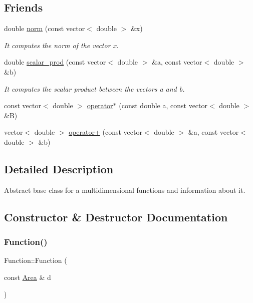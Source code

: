 \subsection*{Friends}
\begin{DoxyCompactItemize}
\item 
double \hyperlink{class_function_a52e0aa61f3f38c1b981ad4c1deeebed5}{norm} (const vector$<$ double $>$ \&x)
\begin{DoxyCompactList}\small\item\em It computes the norm of the vector x. \end{DoxyCompactList}\item 
double \hyperlink{class_function_a5bba89b945d56abb9cf2dd756cf71fb8}{scalar\+\_\+prod} (const vector$<$ double $>$ \&a, const vector$<$ double $>$ \&b)
\begin{DoxyCompactList}\small\item\em It computes the scalar product between the vectors a and b. \end{DoxyCompactList}\item 
const vector$<$ double $>$ \hyperlink{class_function_a5c042028e918038808f0b9255d846bdc}{operator$\ast$} (const double a, const vector$<$ double $>$ \&B)
\item 
vector$<$ double $>$ \hyperlink{class_function_af7fb1be44ca3ade61cec8d396d0a3ca1}{operator+} (const vector$<$ double $>$ \&a, const vector$<$ double $>$ \&b)
\end{DoxyCompactItemize}


\subsection{Detailed Description}
Abstract base class for a multidimensional functions and information about it. 

\subsection{Constructor \& Destructor Documentation}
\mbox{\label{class_function_a7055e57520effff828782ea44498c3e3}} 
\subsubsection{\texorpdfstring{Function()}{Function()}\hspace{0.1cm}{\footnotesize\ttfamily [1/2]}}
{\footnotesize\ttfamily Function\+::\+Function (\begin{DoxyParamCaption}\item[{const \hyperlink{class_area}{Area} \&}]{d }\end{DoxyParamCaption})}

